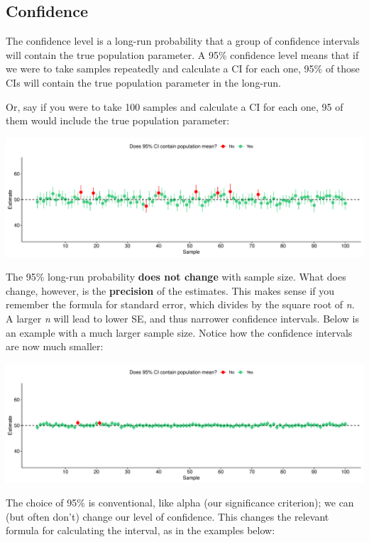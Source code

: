 \documentclass[
]{book}
\begin{document}
\subsection{Confidence}\label{confidence}

The confidence level is a long-run probability that a group of confidence intervals will contain the true population parameter. A 95\% confidence level means that if we were to take samples repeatedly and calculate a CI for each one, 95\% of those CIs will contain the true population parameter in the long-run.

Or, say if you were to take 100 samples and calculate a CI for each one, 95 of them would include the true population parameter:

\includegraphics{_main_files/figure-latex/unnamed-chunk-103-1.pdf}

The 95\% long-run probability \textbf{does not change} with sample size. What does change, however, is the \textbf{precision} of the estimates. This makes sense if you remember the formula for standard error, which divides by the square root of \emph{n}. A larger \emph{n} will lead to lower SE, and thus narrower confidence intervals. Below is an example with a much larger sample size. Notice how the confidence intervals are now much smaller:

\includegraphics{_main_files/figure-latex/unnamed-chunk-104-1.pdf}

The choice of 95\% is conventional, like alpha (our significance criterion); we can (but often don't) change our level of confidence. This changes the relevant formula for calculating the interval, as in the examples below:
\end{document}

